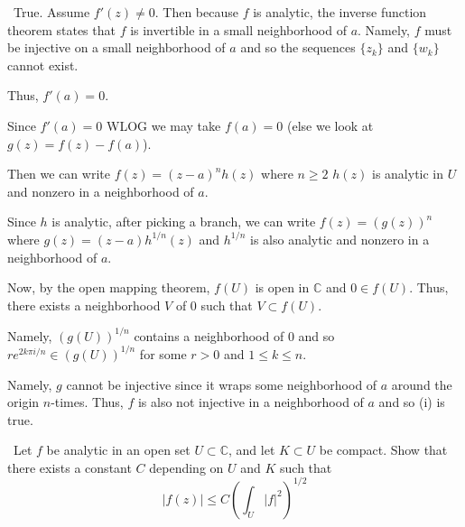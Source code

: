 \documentclass[12pt]{Homework}
\begin{document}
\begin{solution}$\,$
 True. Assume $f'(z)\not=0.$ Then because $f$ is analytic, the inverse function theorem states that $f$ is invertible in a small neighborhood of $a$. Namely, $f$ must be injective on a small neighborhood of $a$ and so the sequences $\{z_k\}$ and $\{w_k\}$ cannot exist.

Thus, $f'(a)=0$.

 Since $f'(a)=0$ WLOG we may take $f(a)=0$ (else we look at $g(z)=f(z)-f(a)$). 

Then we can write $f(z)=(z-a)^nh(z)$ where $n\ge 2$ $h(z)$ is analytic in $U$ and nonzero in a neighborhood of $a.$

Since $h$ is analytic, after picking a branch, we can write $f(z)=(g(z))^n$ where $g(z)=(z-a)h^{1/n}(z)$ and $h^{1/n}$ is also analytic and nonzero in a neighborhood of $a.$

Now, by the open mapping theorem, $f(U)$ is open in $\mathbb{C}$ and $0\in f(U).$ Thus, there exists a neighborhood $V$ of $0$ such that $V\subset f(U).$

Namely, $(g(U))^{1/n}$ contains a neighborhood of $0$ and so $re^{2k\pi i/n}\in (g(U))^{1/n}$ for some $r>0$ and $1\le k\le n$.

Namely, $g$ cannot be injective since it wraps some neighborhood of $a$ around the origin $n$-times. Thus, $f$ is also not injective in a neighborhood of $a$ and so (i) is true. 
\end{solution}
\newpage





\begin{problem} $\,$
Let $f$ be analytic in an open set $U\subset\mathbb{C}$, and let $K\subset U$ be compact. Show that there exists a constant $C$ depending on $U$ and $K$ such that $$|f(z)|\le C\left(\int_U|f|^2\right)^{1/2}$$
\end{problem}
\end{document}
